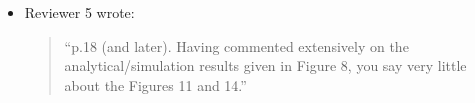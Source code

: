 \documentclass{article}
\begin{document}
\begin{itemize}
\item Reviewer 5 wrote:
\begin{quote}
``p.18 (and later). Having commented extensively on the analytical/simulation
results given in Figure 8, you say very little about the Figures 11 and 14.''
\end{quote}


\end{itemize}
\end{document}
